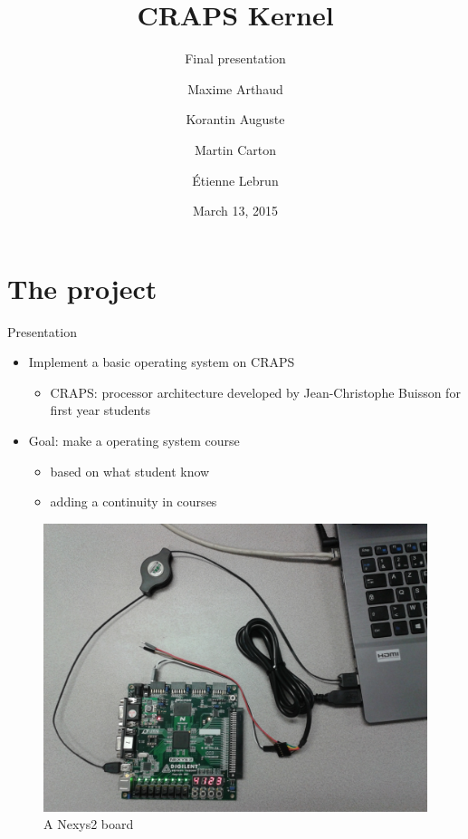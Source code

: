\documentclass{beamer}
\title{CRAPS Kernel}
\subtitle{Final presentation}
\author{
       Maxime Arthaud
  \and Korantin Auguste
  \and Martin Carton
  \and Étienne Lebrun
}
\date{March 13, 2015}
\begin{document}
  \begin{frame}[plain]
    \titlepage%
  \end{frame}

  \begin{frame}[plain]
    \tableofcontents
  \end{frame}

  \section{The project}
    \begin{frame}{Presentation}
      \begin{itemize}
        \item Implement a basic operating system on CRAPS
          \begin{itemize}
            \item CRAPS: processor architecture developed by Jean-Christophe
              Buisson for first year students
          \end{itemize}
        \item Goal: make a operating system course
          \begin{itemize}
            \item based on what student know
            \item adding a continuity in courses
          \end{itemize}
      \end{itemize}
    \end{frame}

    \begin{frame}[plain]
      \begin{figure}
        \centering
        \includegraphics[width=\textwidth, keepaspectratio]{fig/Nexys2.jpg}
        \caption{A Nexys2 board}
      \end{figure}
    \end{frame}
\end{document}
